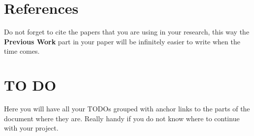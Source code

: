 \documentclass[11pt,letterpaper]{article}
\begin{document}
\section{References}
\begin{tip}
Do not forget to cite the papers that you are using in your research, this way the \textbf{Previous Work} part in your paper will be infinitely easier to write when the time comes.
\end{tip}
\nocite{*}


\clearpage
\section{TO DO}
\begin{tip}
Here you will have all your TODOs grouped with anchor links to the parts of the document where they are. Really handy if you do not know where to continue with your project.
\end{tip}
\listoftodos
\end{document}
